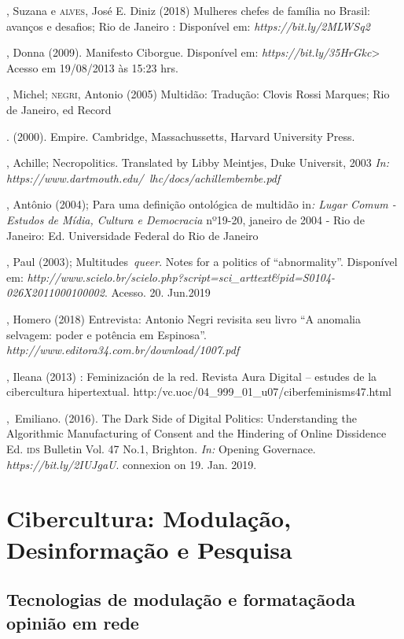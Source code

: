 \begin{bibliohedra}
, Suzana e \textsc{alves}, José E. Diniz (2018) Mulheres chefes de
família no Brasil: avanços e desafios; Rio de Janeiro : Disponível em:
\emph{https://bit.ly/2MLWSq2}

, Donna (2009). Manifesto Ciborgue. Disponível em:
\emph{https://bit.ly/35HrGkc}\textgreater{}
Acesso em 19/08/2013 às 15:23 hrs.

, Michel; \textsc{negri}, Antonio (2005) Multidão: Tradução: Clovis Rossi
Marques; Rio de Janeiro, ed Record

\titidem. (2000). Empire. Cambridge,
Massachussetts, Harvard University Press.

, Achille; Necropolitics. Translated by Libby Meintjes, Duke
Universit, 2003 \emph{In:}
\emph{https://www.dartmouth.edu/~lhc/docs/achillembembe.pdf} %

, Antônio (2004); Para uma definição ontológica de multidão
in\emph{: Lugar Comum - Estudos de Mídia, Cultura e Democracia} nº19-20,
janeiro de 2004 - Rio de Janeiro: Ed. Universidade Federal do Rio de
Janeiro

, Paul (2003); Multitudes~\emph{queer}. Notes for a politics of
``abnormality''. Disponível em:
\emph{http://www.scielo.br/scielo.php?script=sci\_arttext\&pid=S0104-026X2011000100002}. %
Acesso. 20. Jun.2019

, Homero (2018) Entrevista: Antonio Negri revisita seu livro ``A
anomalia selvagem: poder e potência em Espinosa''.
\emph{http://www.editora34.com.br/download/1007.pdf}

, Ileana (2013) : Feminización de la red. Revista Aura
Digital -- estudes de la cibercultura hipertextual.
http:/vc.uoc/04\_999\_01\_u07/ciberfeminisms47.html

,~Emiliano. (2016). The Dark Side of Digital Politics:
Understanding the Algorithmic Manufacturing of Consent and the Hindering
of Online Dissidence Ed. \textsc{ids} Bulletin Vol. 47 No.1, Brighton. \emph{In:}
Opening Governace. \emph{https://bit.ly/2IUJgaU}. connexion on 19. Jan. 2019.
\end{bibliohedra}

\part{Cibercultura: Modulação, Desinformação e Pesquisa}

\chapter*{Tecnologias de modulação e formatação\break da opinião em rede}

